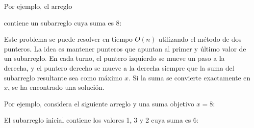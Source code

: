 Por ejemplo, el arreglo
\begin{center}
\end{center}
contiene un subarreglo cuya suma es 8:
\begin{center}
\end{center}

Este problema se puede resolver en tiempo
$O(n)$ utilizando el método de dos punteros.
La idea es mantener punteros que apuntan al
primer y último valor de un subarreglo.
En cada turno, el puntero izquierdo se mueve un paso
a la derecha, y el puntero derecho se mueve a la derecha
siempre que la suma del subarreglo resultante sea como máximo $x$.
Si la suma se convierte exactamente en $x$,
se ha encontrado una solución.

Por ejemplo, considera el siguiente arreglo
y una suma objetivo $x=8$:
\begin{center}
\end{center}

El subarreglo inicial contiene los valores
1, 3 y 2 cuya suma es 6:

